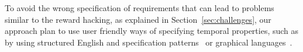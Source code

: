 \documentclass[sigconf,review, anonymous]{acmart}
\begin{document}
To avoid the wrong specification of requirements that can lead to problems similar to the reward hacking, as explained in Section~\ref{sec:challenges}, our approach plan to use user friendly ways of specifying temporal properties, such as by using structured English and specification patterns~\cite{TSE2015} or graphical languages~\cite{LSC,AIP07}.

\end{document}
